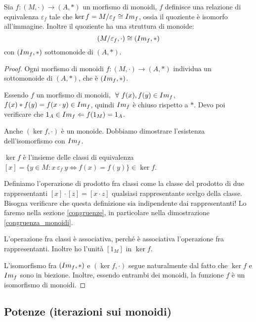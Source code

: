 \begin{prop}
Sia $f : (M, \cdot) \to (A, \ast)$ un morfismo di monoidi, $f$ definisce una relazione di equivalenza $\varepsilon_f$ tale che $\ker f = M / \varepsilon_f \cong Im_{f}$, ossia il quoziente \`e isomorfo all'immagine. Inoltre il quoziente ha una struttura di monoide:
\[
(M / \varepsilon_f , \cdot) \cong (Im_{f}, \ast)
\]
con $(Im_{f}, \ast)$ sottomonoide di $(A, \ast)$.
\end{prop}
\begin{proof}
Ogni morfismo di monoidi $f : (M, \cdot) \to (A, \ast)$ individua un sottomonoide di $(A, \ast)$, che \`e $(Im_{f}, \ast)$. 

Essendo $f$ un morfismo di monoidi, $\forall f(x), f(y) \in \image{f}$, $f(x) \ast f(y) = f(x \cdot y) \in Im_{f}$, quindi $Im_{f} $ \`e chiuso rispetto a $\ast$. Devo poi verificare che $1_A \in Im_{f} \Leftarrow f(1_M) = 1_A$.

Anche $(\ker f, \cdot)$ \`e un monoide. Dobbiamo dimostrare l'esistenza dell'isomorfismo con $Im_{f}$.

$\ker f$ \`e l'insieme delle classi di equivalenza $[x] = \{ y \in M : x \ \varepsilon_f \ y \iff f(x) = f(y) \} \in \ker f$.

Definiamo l'operazione di prodotto fra classi come la classe del prodotto di due rappresentanti $[x] \cdot [z] = [x \cdot z]$ qualsiasi rappresentante scelgo della classe. Bisogna verificare che questa definizione sia indipendente dai rappresentanti! Lo faremo nella sezione \ref{congruenze}, in particolare nella dimostrazione \ref{congruenza_monoidi}. %

L'operazione fra classi \`e associativa, perch\'e \`e associativa l'operazione fra rappresentanti. Inoltre ho l'unit\`a $[1_M]$ in $\ker f$.

L'isomorfismo fra $(Im_{f}, \ast)$ e $(\ker f, \cdot)$ segue naturalmente dal fatto che $\ker f $ e $Im_{f}$ sono in biezione. Inoltre, essendo entrambi dei monoidi, la funzione $f$ \`e un isomorfismo di monoidi.
\end{proof}

\subsection{Potenze (iterazioni sui monoidi)}

